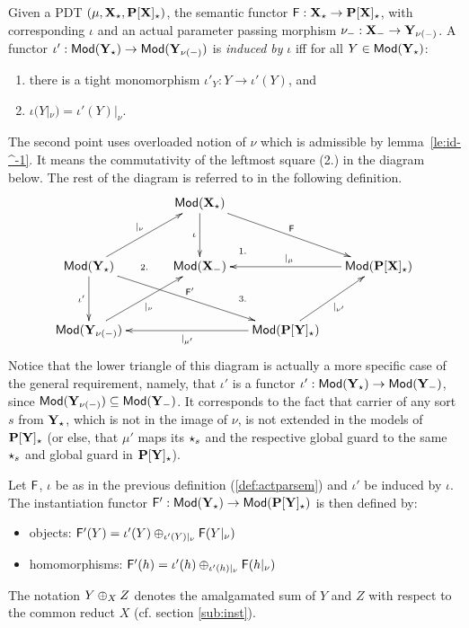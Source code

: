 \begin{definition}\label{def:actparsem}
Given a PDT $(\mu,{\bf X_\star}, {\bf P[X]_\star})$,
the semantic functor ${\sf {F}}:{\bf X_\star} \to {\bf P[X]_\star}$, with
corresponding $\iota$ and an actual parameter passing morphism $\nu_-:
{\bf X_-} \to {\bf Y_{\nu(-)}}$. A 
functor $\iota': {\sf {Mod}}({\bf Y_\star}) \to
{\sf {Mod}}({\bf Y_{\nu(-)}})$ is {\em induced by} $\iota$ iff for all $Y \in
{\sf {Mod}}({\bf Y_\star})$:
\begin{enumerate}\MyLPar
\item there is a tight monomorphism $\iota'_Y:Y\to \iota'(Y)$, and
\item $\iota( Y |_{\nu}) = \iota'(Y)|_{\nu}$.
\end{enumerate}
\end{definition}
The second point uses overloaded notion of $\nu$ which is admissible by
lemma~\ref{le:id-^-1}. It means the commutativity of the leftmost
square (2.)
in the diagram below. The rest of the diagram is referred to 
in the following definition.
\[ \xymatrix@R=0.5cm@C=0.5cm{
&& \Mod(\thr{X_\cons})  \ar[dd]_{\iota} \ar[rrdd]^{\fu{F}}\\
&& && \\
\Mod(\thr{Y_\cons}) \ar[dd]_{\iota'} \ar[rrrdd]^{\fu{F'}} \ar[rruu]^{|_{\nu}}
	&& \Mod(\thr{X_{\weak}}) \ar@{}[ur]|{1.}
		&& \Mod(\thr{P[X]_\cons}) \ar[ll]_{|_{\mu}} \\
&& && \\
\Mod(\thr{Y_{\nu(\weak)}}) \ar[uurr]_{|_{\nu}}  \ar@{}[uuuurr]|{2.}
	&&& \Mod(\thr{P[Y]_\cons}) \ar[lll]^{|_{\mu'}} \ar[uur]_{|_{\nu'}} \ar@{}[luu]|{3.}	
								}
\]
%
Notice that the lower triangle of this diagram is actually a more specific
case of the general requirement, namely, that $\iota'$ is a functor
$\iota':{\sf {Mod}}({\bf Y_\star})\to{\sf {Mod}}({\bf Y_-})$, since
${\sf {Mod}}({\bf Y_{\nu(-)}})\subseteq{\sf {Mod}}({\bf Y_-})$. It corresponds to
the fact that carrier of any sort $s$ from ${\bf Y_\star}$, which is not in the image of $\nu$, is not
extended in the models of ${\bf P[Y]_\star}$ (or else, that $\mu'$ maps its
 $\star_s$ and the respective global guard to the same $\star_s$ and global guard in
${\bf P[Y]_\star}$).
%
\begin{definition}\label{def:actinstfunct} 
Let ${\sf {F}}$, $\iota$ be as in the previous definition (\ref{def:actparsem}) and
$\iota'$ be induced by $\iota$. 
The instantiation functor ${\sf {F'}}: {\sf {Mod}}({\bf Y_\star}) \to
{\sf {Mod}}({\bf P[Y]_\star})$ is then defined by: 
\begin{itemize} 
\item objects: ${\sf {F'}}(Y) = \iota'(Y)
	\oplus_{\iota'(Y)|_{\nu}} {\sf {F}}(Y|_\nu)$ 
\item homomorphisms:
	${\sf {F'}}(h) = \iota'(h) \oplus_{\iota'(h)|_{\nu}} {\sf {F}}(h|_\nu)$
\end{itemize}
\end{definition}
The notation $Y\oplus_X Z$ denotes the amalgamated sum of $Y$ and $Z$ with
respect to the common reduct $X$ (cf. section \ref{sub:inst}).


